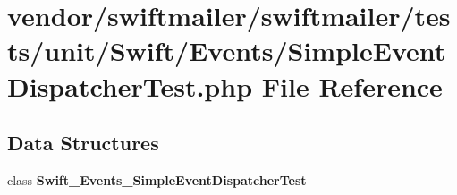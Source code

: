 \section{vendor/swiftmailer/swiftmailer/tests/unit/\+Swift/\+Events/\+Simple\+Event\+Dispatcher\+Test.php File Reference}
\label{_simple_event_dispatcher_test_8php}
\subsection*{Data Structures}
\begin{DoxyCompactItemize}
\item 
class {\bf Swift\+\_\+\+Events\+\_\+\+Simple\+Event\+Dispatcher\+Test}
\end{DoxyCompactItemize}
